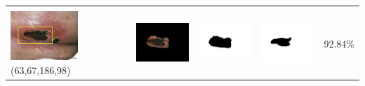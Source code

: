 \begin{table}[H]
\begin{tabular}{|m{1.0in}|m{1.0in}|m{1.0in}|m{1.0in}|m{0.6in}|}
		&  &  & \\
		\includegraphics[width=1.0in]{gambar/hasil_segmentasi/luka_hitam/image_40_rect.jpg} {\centering\fontsize{10}{10}\selectfont(63,67,186,98)}&
		\includegraphics[width=1.0in]{gambar/hasil_segmentasi/luka_hitam/result_40.jpg}&
		\includegraphics[width=1.0in]{gambar/hasil_segmentasi/luka_hitam/mask_r_40.jpg}&
		\includegraphics[width=1.0in]{gambar/hasil_segmentasi/luka_hitam/40_r.jpg}&
		92.84\% \\
		\hline 
	\end{tabular}
\end{table}

